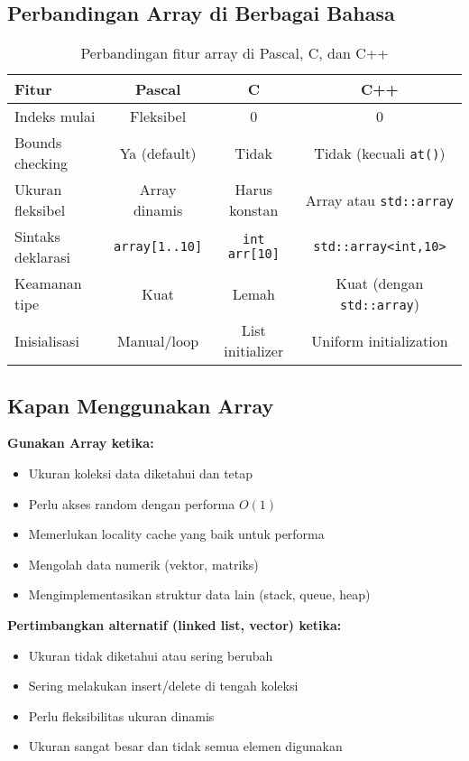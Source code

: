 \documentclass[../main.tex]{subfiles}
\begin{document}
\subsection{Perbandingan Array di Berbagai Bahasa}

\begin{table}[h]
\centering
\begin{tabular}{|l|c|c|c|}
\hline
\textbf{Fitur} & \textbf{Pascal} & \textbf{C} & \textbf{C++} \\
\hline
Indeks mulai & Fleksibel & 0 & 0 \\
\hline
Bounds checking & Ya (default) & Tidak & Tidak (kecuali \texttt{at()}) \\
\hline
Ukuran fleksibel & Array dinamis & Harus konstan & Array atau \texttt{std::array} \\
\hline
Sintaks deklarasi & \texttt{array[1..10]} & \texttt{int arr[10]} & \texttt{std::array<int,10>} \\
\hline
Keamanan tipe & Kuat & Lemah & Kuat (dengan \texttt{std::array}) \\
\hline
Inisialisasi & Manual/loop & List initializer & Uniform initialization \\
\hline
\end{tabular}
\caption{Perbandingan fitur array di Pascal, C, dan C++}
\end{table}

\subsection{Kapan Menggunakan Array}

\textbf{Gunakan Array ketika:}
\begin{itemize}
  \item Ukuran koleksi data diketahui dan tetap
  \item Perlu akses random dengan performa \(O(1)\)
  \item Memerlukan locality cache yang baik untuk performa
  \item Mengolah data numerik (vektor, matriks)
  \item Mengimplementasikan struktur data lain (stack, queue, heap)
\end{itemize}

\textbf{Pertimbangkan alternatif (linked list, vector) ketika:}
\begin{itemize}
  \item Ukuran tidak diketahui atau sering berubah
  \item Sering melakukan insert/delete di tengah koleksi
  \item Perlu fleksibilitas ukuran dinamis
  \item Ukuran sangat besar dan tidak semua elemen digunakan
\end{itemize}
\end{document}
